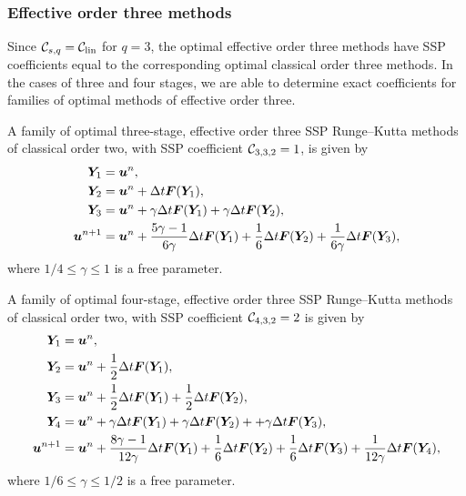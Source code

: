 \subsubsection{Effective order three methods}\label{subsubsec:3rd_ESSPRK}
Since $\mathcal{C}_{s,q}=\mathcal{C}_{\text{lin}}$ for $q=3$, the optimal effective order three methods
have SSP coefficients equal to the corresponding optimal classical order three methods.
In the cases of three and four stages, we are able to determine exact coefficients for
families of optimal methods of effective order three.
\begin{theorem}\label{thm:ESSPRK(3,3,2)}
	A family of optimal three-stage, effective order three SSP Runge--Kutta 
	methods of classical order two, with SSP coefficient $\mathcal{C}_{3,3,2} = 1$, is given by
    \begin{displaymath}
    		\begin{split}
    			\bm{Y}_1 &= \bm{u}^n, \\
    			\bm{Y}_2 &= \bm{u}^n + \Delta t\bm{F}(\bm{Y}_1), \\
    			\bm{Y}_3 &= \bm{u}^n + \gamma\Delta t\bm{F}(\bm{Y}_1) + \gamma\Delta t\bm{F}(\bm{Y}_2), \\
    			\bm{u}^{n+1} &= \bm{u}^n + \frac{5\gamma-1}{6\gamma}\Delta t\bm{F}(\bm{Y}_1) + \frac{1}{6}\Delta t\bm{F}(\bm{Y}_2) + \frac{1}{6\gamma}\Delta t\bm{F}(\bm{Y}_3),
        \end{split}
    \end{displaymath}
    where $1/4 \leq \gamma \leq 1$ is a free parameter.
\end{theorem}
\begin{theorem}\label{thm:ESSPRK(4,3,2)}
	A family of optimal four-stage, effective order three SSP Runge--Kutta 
	methods of classical order two, with SSP coefficient $\mathcal{C}_{4,3,2} = 2$ is given by
    \begin{displaymath}
    		\begin{split}
    			\bm{Y}_1 &= \bm{u}^n, \\
    			\bm{Y}_2 &= \bm{u}^n + \frac{1}{2}\Delta t\bm{F}(\bm{Y}_1), \\
    			\bm{Y}_3 &= \bm{u}^n + \frac{1}{2}\Delta t\bm{F}(\bm{Y}_1) + \frac{1}{2}\Delta t\bm{F}(\bm{Y}_2), \\
    			\bm{Y}_4 &= \bm{u}^n + \gamma\Delta t\bm{F}(\bm{Y}_1) + \gamma\Delta t\bm{F}(\bm{Y}_2) + + \gamma\Delta t\bm{F}(\bm{Y}_3), \\
    			\bm{u}^{n+1} &= \bm{u}^n + \frac{8\gamma-1}{12\gamma}\Delta t\bm{F}(\bm{Y}_1) + \frac{1}{6}\Delta t\bm{F}(\bm{Y}_2) + \frac{1}{6}\Delta t\bm{F}(\bm{Y}_3) + \frac{1}{12\gamma}\Delta t\bm{F}(\bm{Y}_4),
        \end{split}
    \end{displaymath}
    where $ 1/6 \leq \gamma \leq 1/2 $ is a free parameter.
\end{theorem}
